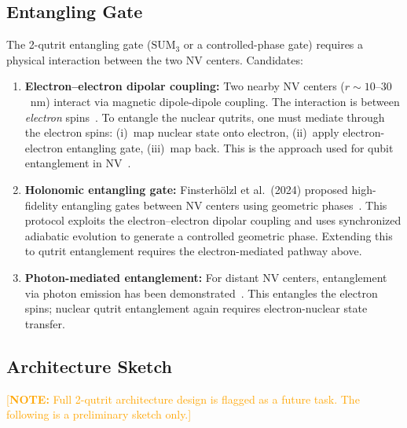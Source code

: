 \documentclass[11pt,letterpaper]{article}
\newcommand{\opennote}[1]{\textcolor{orange}{[\textbf{NOTE:} #1]}}
\begin{document}
\subsection{Entangling Gate}

The 2-qutrit entangling gate ($\text{SUM}_3$ or a controlled-phase gate) requires a
physical interaction between the two NV centers. Candidates:

\begin{enumerate}
  \item \textbf{Electron--electron dipolar coupling:} Two nearby NV centers ($r \sim
    10$--$30$~nm) interact via magnetic dipole-dipole coupling. The interaction is between
    \emph{electron} spins~\cite{Dolde2013}. %
    To entangle the nuclear qutrits, one must
    mediate through the electron spins: (i)~map nuclear state onto electron, (ii)~apply
    electron-electron entangling gate, (iii)~map back. This is the approach used for
    qubit entanglement in NV~\cite{Bradley2019, Pompili2021}.

  \item \textbf{Holonomic entangling gate:} Finsterh\"{o}lzl et al.\ (2024) proposed
    high-fidelity entangling gates between NV centers using geometric
    phases~\cite{Finsterhoelzl2024}. This protocol exploits the electron--electron dipolar
    coupling and uses synchronized adiabatic evolution to generate a controlled geometric
    phase. Extending this to qutrit entanglement requires the electron-mediated pathway
    above.

  \item \textbf{Photon-mediated entanglement:} For distant NV centers, entanglement via
    photon emission has been demonstrated~\cite{Pompili2021, Hermans2022}. This entangles
    the electron spins; nuclear qutrit entanglement again requires electron-nuclear state
    transfer.
\end{enumerate}

\subsection{Architecture Sketch}

\opennote{Full 2-qutrit architecture design is flagged as a future task. The following
is a preliminary sketch only.}
\end{document}
